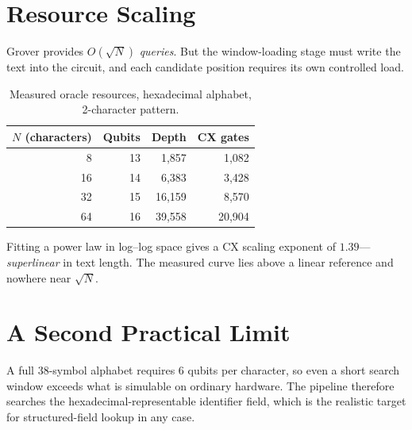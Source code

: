 \documentclass[11pt,a4paper]{article}
\begin{document}
\section{Resource Scaling}

Grover provides $O(\sqrt{N})$ \emph{queries}. But the window-loading stage must
write the text into the circuit, and each candidate position requires its own
controlled load.

\begin{table}[h]
\centering
\caption{Measured oracle resources, hexadecimal alphabet, 2-character pattern.}
\begin{tabular}{@{}rrrr@{}}
\toprule
$N$ (characters) & Qubits & Depth & CX gates \\
\midrule
8 & 13 & 1{,}857 & 1{,}082 \\
16 & 14 & 6{,}383 & 3{,}428 \\
32 & 15 & 16{,}159 & 8{,}570 \\
64 & 16 & 39{,}558 & 20{,}904 \\
\bottomrule
\end{tabular}
\end{table}

Fitting a power law in log--log space gives a CX scaling exponent of
$\mathbf{1.39}$---\emph{superlinear} in text length. The measured curve lies
above a linear reference and nowhere near $\sqrt{N}$.


\section{A Second Practical Limit}

A full 38-symbol alphabet requires 6 qubits per character, so even a short search
window exceeds what is simulable on ordinary hardware. The pipeline therefore
searches the hexadecimal-representable identifier field, which is the realistic
target for structured-field lookup in any case.
\end{document}

